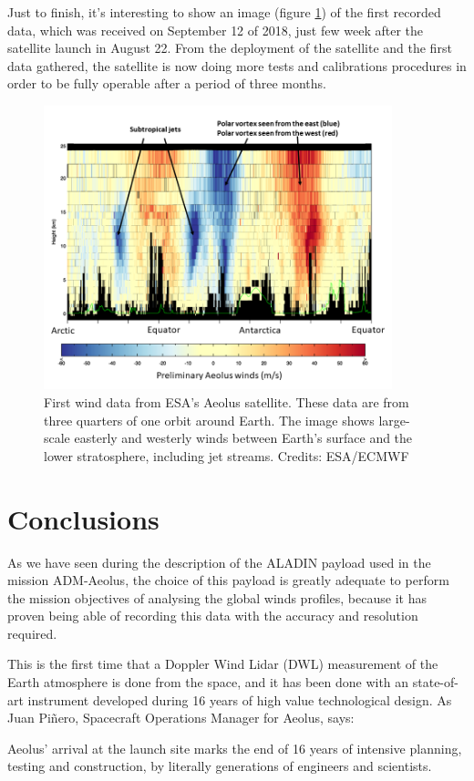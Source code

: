 Just to finish, it's interesting to show an image (figure \ref{fig:results}) of the
first recorded data, which was received on September 12 of 2018, just few week after
the satellite launch in August 22. From the deployment of the satellite and the first
data gathered, the satellite is now doing more tests and calibrations procedures in
order to be fully operable after a period of three months.\\

\begin{figure}[h]
	\centering
	\includegraphics[width=0.9\textwidth]{img/20180912_First_wind_measurement.png}
	\caption[First wind data gathered from Aeolus]{First wind data from ESA’s
	Aeolus satellite. These data are from three quarters of one orbit around
	Earth. The image shows large-scale easterly and westerly winds between
	Earth’s surface and the lower stratosphere, including jet streams. Credits: ESA/ECMWF\cite{first_data}}
	\label{fig:results}
\end{figure}

\clearpage
\section{Conclusions}

As we have seen during the description of the ALADIN payload used in the mission
ADM-Aeolus, the choice of this payload is greatly adequate to perform the mission
objectives of analysing the global winds profiles, because it has proven being able
of recording this data with the accuracy and resolution required.

This is the first time that a Doppler Wind Lidar (DWL) measurement of the Earth
atmosphere is done from the space, and it has been done with an state-of-art instrument
developed during 16 years of high value technological design. As Juan Piñero,
Spacecraft Operations Manager for Aeolus, says:

\begin{center}
\begin{minipage}{0.9\linewidth}
\vspace{5pt}%
{\small
Aeolus’ arrival at the launch site marks the end of 16 years of intensive planning,
testing and construction, by literally generations of engineers and scientists.
}
\end{minipage}
\end{center}
